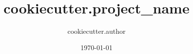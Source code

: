 \documentclass[10pt, t]{beamer}
\title{ {{cookiecutter.project_name}} }
\author{ {{cookiecutter.author}} }
\date{\today}
\begin{document}
\begin{frame}
	\maketitle
\end{frame}
\end{document}
